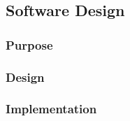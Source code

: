 \pagebreak
\subsection{Software Design}

\subsubsection{Purpose}

\subsubsection{Design} \label{sec:4.8.2}

\subsubsection{Implementation}\label{sec:4.8.3}


\raggedbottom